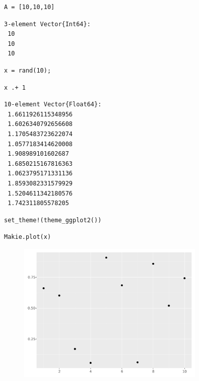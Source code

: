 \begin{lstlisting}[language=JuliaLocal, style=julia]
A = [10,10,10]
\end{lstlisting}

\begin{verbatim}
3-element Vector{Int64}:
 10
 10
 10
\end{verbatim}

\begin{lstlisting}[language=JuliaLocal, style=julia]
x = rand(10);
\end{lstlisting}

\begin{lstlisting}[language=JuliaLocal, style=julia]
x .+ 1
\end{lstlisting}

\begin{verbatim}
10-element Vector{Float64}:
 1.6611926115348956
 1.6026340792656608
 1.1705483723622074
 1.0577183414620008
 1.908989101602687
 1.6850215167816363
 1.0623795171331136
 1.8593082331579929
 1.5204611342180576
 1.742311805578205
\end{verbatim}

\begin{lstlisting}[language=JuliaLocal, style=julia]
set_theme!(theme_ggplot2())
\end{lstlisting}

\begin{lstlisting}[language=JuliaLocal, style=julia]
Makie.plot(x)
\end{lstlisting}

\begin{figure}[H]
	\centering
	\includegraphics[width=0.8\textwidth]{./figures/notebooktest_figure2.pdf}
	\label{fig:notebooktest_figure2.pdf}

\end{figure}

